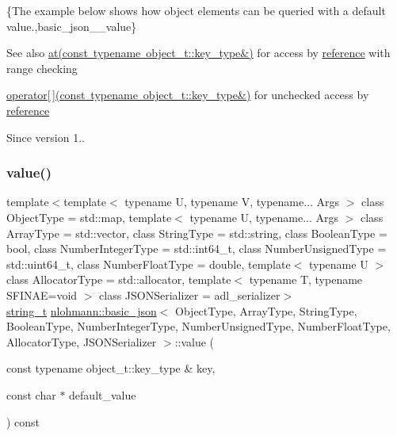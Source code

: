 \{The example below shows how object elements can be queried with a default value.,basic\+\_\+json\+\_\+\+\_\+value\}

\begin{DoxySeeAlso}{See also}
\mbox{\hyperlink{classnlohmann_1_1basic__json_a93403e803947b86f4da2d1fb3345cf2c}{at(const typename object\+\_\+t\+::key\+\_\+type\&)}} for access by \mbox{\hyperlink{classnlohmann_1_1basic__json_ac6a5eddd156c776ac75ff54cfe54a5bc}{reference}} with range checking 

\mbox{\hyperlink{classnlohmann_1_1basic__json_a233b02b0839ef798942dd46157cc0fe6}{operator\mbox{[}$\,$\mbox{]}(const typename object\+\_\+t\+::key\+\_\+type\&)}} for unchecked access by \mbox{\hyperlink{classnlohmann_1_1basic__json_ac6a5eddd156c776ac75ff54cfe54a5bc}{reference}}
\end{DoxySeeAlso}
\begin{DoxySince}{Since}
version 1.. 
\end{DoxySince}
\mbox{\label{classnlohmann_1_1basic__json_ad6a18403e7fbac9c4efd06facc71fc88}} 
\subsubsection{\texorpdfstring{value()}{value()}\hspace{0.1cm}{\footnotesize\ttfamily [2/4]}}
{\footnotesize\ttfamily template$<$template$<$ typename U, typename V, typename... Args $>$ class Object\+Type = std\+::map, template$<$ typename U, typename... Args $>$ class Array\+Type = std\+::vector, class String\+Type  = std\+::string, class Boolean\+Type  = bool, class Number\+Integer\+Type  = std\+::int64\+\_\+t, class Number\+Unsigned\+Type  = std\+::uint64\+\_\+t, class Number\+Float\+Type  = double, template$<$ typename U $>$ class Allocator\+Type = std\+::allocator, template$<$ typename T, typename S\+F\+I\+N\+A\+E=void $>$ class J\+S\+O\+N\+Serializer = adl\+\_\+serializer$>$ \\
\mbox{\hyperlink{classnlohmann_1_1basic__json_a61f8566a1a85a424c7266fb531dca005}{string\+\_\+t}} \mbox{\hyperlink{classnlohmann_1_1basic__json}{nlohmann\+::basic\+\_\+json}}$<$ Object\+Type, Array\+Type, String\+Type, Boolean\+Type, Number\+Integer\+Type, Number\+Unsigned\+Type, Number\+Float\+Type, Allocator\+Type, J\+S\+O\+N\+Serializer $>$\+::value (\begin{DoxyParamCaption}\item[{const typename object\+\_\+t\+::key\+\_\+type \&}]{key,  }\item[{const char $\ast$}]{default\+\_\+value }\end{DoxyParamCaption}) const\hspace{0.3cm}{\ttfamily [inline]}}



